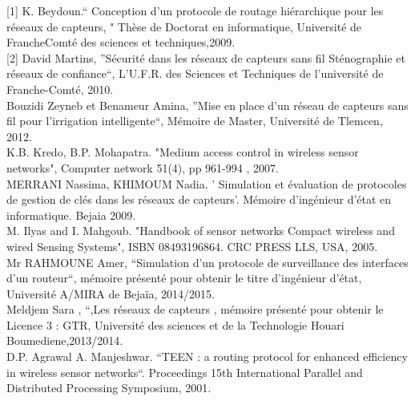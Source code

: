\documentclass[paper=a4, fontsize=11pt]{scrartcl}
\numberwithin{equation}{section}		%
\numberwithin{figure}{section}			%
\numberwithin{table}{section}				%
\begin{document}
\pagebreak


[1] K. Beydoun.“ Conception d’un protocole de routage hiérarchique pour les
réseaux de capteurs, " Thèse de Doctorat en informatique, Université de FrancheComté des sciences et techniques,2009.\\

[2] David Martins, ”Sécurité dans les réseaux de capteurs sans fil Sténographie et réseaux
de confiance“, L'U.F.R. des Sciences et Techniques de l’université de Franche-Comté, 2010.\\  
[3] Bouzidi Zeyneb et Benameur Amina, ”Mise en place d’un réseau de capteurs sans fil
pour l’irrigation intelligente“, Mémoire de Master, Université de Tlemcen, 2012.\\ 
[4] K.B. Kredo, B.P. Mohapatra. "Medium access control in wireless sensor networks",
Computer network 51(4), pp 961-994 , 2007.\\ 
[5] MERRANI Nassima, KHIMOUM Nadia. ’ Simulation et évaluation de protocoles de
gestion de clés dans les réseaux de capteurs’. Mémoire d’ingénieur d’état en informatique.
Bejaia 2009.\\ 
[6] M. Ilyas and I. Mahgoub. "Handbook of sensor networks Compact wireless and wired
Sensing Systems", ISBN 08493196864. CRC PRESS LLS, USA, 2005.\\ 
[7] Mr RAHMOUNE Amer, “Simulation d’un protocole de surveillance des interfaces d’un
routeur“, mémoire présenté pour obtenir le titre d'ingénieur d'état, Université A/MIRA de
Bejaïa, 2014/2015.\\ 
[8] Meldjem Sara , “,Les réseaux de capteurs , mémoire présenté pour obtenir le Licence 3 :
GTR, Université des sciences et de la Technologie Houari Boumediene,2013/2014.\\ 
[9] D.P. Agrawal A. Manjeshwar. “TEEN : a routing protocol for enhanced efficiency in
wireless sensor networks“. Proceedings 15th International Parallel and Distributed
Processing Symposium, 2001.
\end{document}

